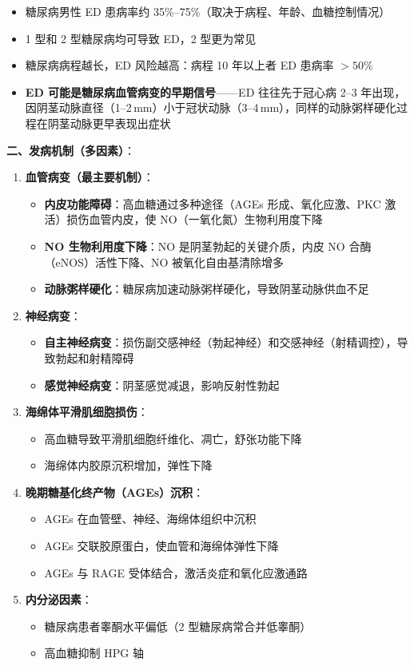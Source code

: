 \documentclass[12pt,a4paper,twoside]{ctexbook}
\begin{document}
\begin{itemize}[leftmargin=2cm]
	\item 糖尿病男性 ED 患病率约 35\%--75\%（取决于病程、年龄、血糖控制情况）
	\item 1 型和 2 型糖尿病均可导致 ED，2 型更为常见
	\item 糖尿病病程越长，ED 风险越高：病程 10 年以上者 ED 患病率 $>50\%$
	\item \textbf{ED 可能是糖尿病血管病变的早期信号}——ED 往往先于冠心病 2--3 年出现，因阴茎动脉直径（1--2\,mm）小于冠状动脉（3--4\,mm），同样的动脉粥样硬化过程在阴茎动脉更早表现出症状
\end{itemize}

\vspace{0.5em}
\noindent\textbf{二、发病机制（多因素）}：

\begin{enumerate}
	\item \textbf{血管病变（最主要机制）}：
	\begin{itemize}
		\item \textbf{内皮功能障碍}：高血糖通过多种途径（AGEs 形成、氧化应激、PKC 激活）损伤血管内皮，使 NO（一氧化氮）生物利用度下降
		\item \textbf{NO 生物利用度下降}：NO 是阴茎勃起的关键介质，内皮 NO 合酶（eNOS）活性下降、NO 被氧化自由基清除增多
		\item \textbf{动脉粥样硬化}：糖尿病加速动脉粥样硬化，导致阴茎动脉供血不足
	\end{itemize}

	\item \textbf{神经病变}：
	\begin{itemize}
		\item \textbf{自主神经病变}：损伤副交感神经（勃起神经）和交感神经（射精调控），导致勃起和射精障碍
		\item \textbf{感觉神经病变}：阴茎感觉减退，影响反射性勃起
	\end{itemize}

	\item \textbf{海绵体平滑肌细胞损伤}：
	\begin{itemize}
		\item 高血糖导致平滑肌细胞纤维化、凋亡，舒张功能下降
		\item 海绵体内胶原沉积增加，弹性下降
	\end{itemize}

	\item \textbf{晚期糖基化终产物（AGEs）沉积}：
	\begin{itemize}
		\item AGEs 在血管壁、神经、海绵体组织中沉积
		\item AGEs 交联胶原蛋白，使血管和海绵体弹性下降
		\item AGEs 与 RAGE 受体结合，激活炎症和氧化应激通路
	\end{itemize}

	\item \textbf{内分泌因素}：
	\begin{itemize}
		\item 糖尿病患者睾酮水平偏低（2 型糖尿病常合并低睾酮）
		\item 高血糖抑制 HPG 轴
	\end{itemize}
\end{enumerate}
\end{document}
